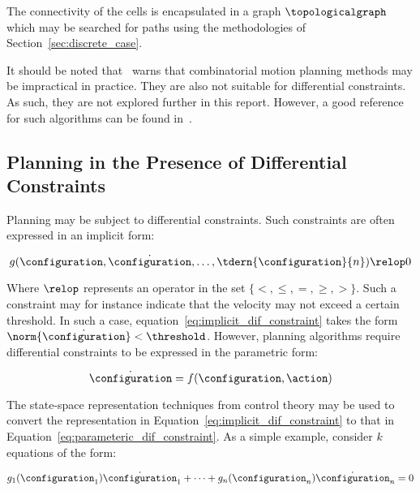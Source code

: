 			The connectivity of the cells is encapsulated in a graph
			$\topologicalgraph$ which may be searched for paths using the
			methodologies of Section~\ref{sec:discrete_case}.

			It should be noted that~\cite{bib:planning:planning_algorithms}
			warns that combinatorial motion planning methods may be impractical
			in practice. They are also not suitable for differential
			constraints.  As such, they are not explored further in this report.
			However, a good reference for such algorithms can be found
			in~\cite{bib:planning:robot_motion_planning}.


	\subsection{Planning in the Presence of Differential Constraints}%
	\label{sec:planning_in_the_presence_of_differential_constraints}

		Planning may be subject to differential constraints. Such constraints
		are often expressed in an implicit form:

		\begin{equation}
			g(\configuration, \dot{\configuration}, \ldots, \tdern{\configuration}{n})
				\relop 0
			\label{eq:implicit_dif_constraint}
		\end{equation}

		Where $\relop$ represents an operator in the set \ensuremath{\{<, \leq,
		=, \geq, >\}}.  Such a constraint may for instance indicate that the
		velocity may not exceed a certain threshold. In such a case,
		equation~\ref{eq:implicit_dif_constraint} takes the form
		$\norm{\dot{\configuration}} < \threshold$.  However, planning
		algorithms require differential constraints to be expressed in the
		parametric form:

		\begin{equation}
			\dot{\configuration} = f(\configuration, \action)
			\label{eq:parameteric_dif_constraint}
		\end{equation}

		The state-space representation techniques from control theory may be
		used to convert the representation in
		Equation~\ref{eq:implicit_dif_constraint} to that in
		Equation~\ref{eq:parameteric_dif_constraint}. As a simple example,
		consider $k$ equations of the form:

		\begin{equation}
			g_1(\configuration_1)\dot{\configuration}_1 + \cdots +
				g_n(\configuration_n)\dot{\configuration}_n
			=
			0
		\end{equation}

